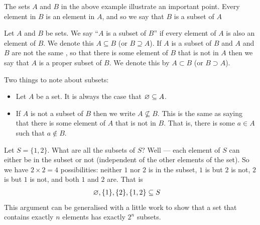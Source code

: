 The sets $A$ and $B$ in the above example illustrate an important point. Every
element in $B$ is an element in $A$, and so we say that $B$ is a subset of $A$
\begin{defn}\label{def_0_3_2}
Let $A$ and $B$ be sets. We say ``$A$ is a subset of $B$'' if every
element of $A$ is also an element of $B$. We denote this $A \subseteq B$ (or $B
\supseteq A$). If $A$ is a subset of $B$ and $A$ and $B$ are not the same , so
that there is some element of $B$ that is not in $A$ then we say that $A$ is a
proper subset of $B$. We denote this by $A \subset B$ (or $B \supset A$).
\end{defn}
Two things to note about subsets:
\begin{itemize}
\item Let $A$ be a set. It is always the case that ${\varnothing} \subseteq A$.
\item If $A$ is not a subset of $B$ then we write $A \not\subseteq B$. This is
the same as saying that there is some element of $A$ that is not in $B$. That
is, there is some $a \in A$ such that $a \notin B$.
\end{itemize}
\begin{eg}[subsets]\label{eg_0_3_2}
Let $S = \{1,2\}$. What are all the subsets of $S$? Well --- each element of
$S$ can either be in the subset or not (independent of the other elements of
the set). So we have $2\times2 = 4$ possibilities: neither $1$ nor $2$ is in the
subset, $1$ is but $2$ is not, $2$ is but $1$ is not, and both $1$ and $2$ are.
That is
\begin{align*}
  {\varnothing}, \{1\}, \{2\}, \{1,2\} & \subseteq S
\end{align*}
This argument can be generalised with a little work to show that a set that
contains exactly $n$ elements has exactly $2^n$ subsets.
\end{eg}

